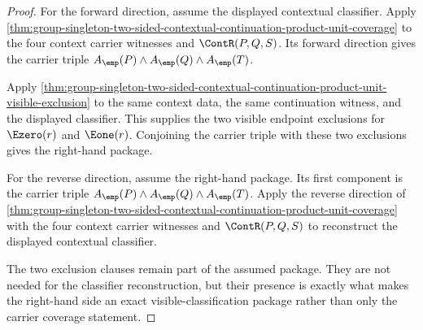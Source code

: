 \begin{proof}
For the forward direction, assume the displayed contextual classifier. Apply
\autoref{thm:group-singleton-two-sided-contextual-continuation-product-unit-coverage}
to the four context carrier witnesses and $\ContR(P,Q,S)$. Its forward
direction gives the carrier triple
$A_{\emp}(P)\land A_{\emp}(Q)\land A_{\emp}(T)$.

Apply
\autoref{thm:group-singleton-two-sided-contextual-continuation-product-unit-visible-exclusion}
to the same context data, the same continuation witness, and the displayed
classifier. This supplies the two visible endpoint exclusions for
$\Ezero(r)$ and $\Eone(r)$. Conjoining the carrier triple with these two
exclusions gives the right-hand package.

For the reverse direction, assume the right-hand package. Its first component
is the carrier triple $A_{\emp}(P)\land A_{\emp}(Q)\land A_{\emp}(T)$. Apply
the reverse direction of
\autoref{thm:group-singleton-two-sided-contextual-continuation-product-unit-coverage}
with the four context carrier witnesses and $\ContR(P,Q,S)$ to reconstruct
the displayed contextual classifier.

The two exclusion clauses remain part of the assumed package. They are not
needed for the classifier reconstruction, but their presence is exactly what
makes the right-hand side an exact visible-classification package rather than
only the carrier coverage statement.
\end{proof}
